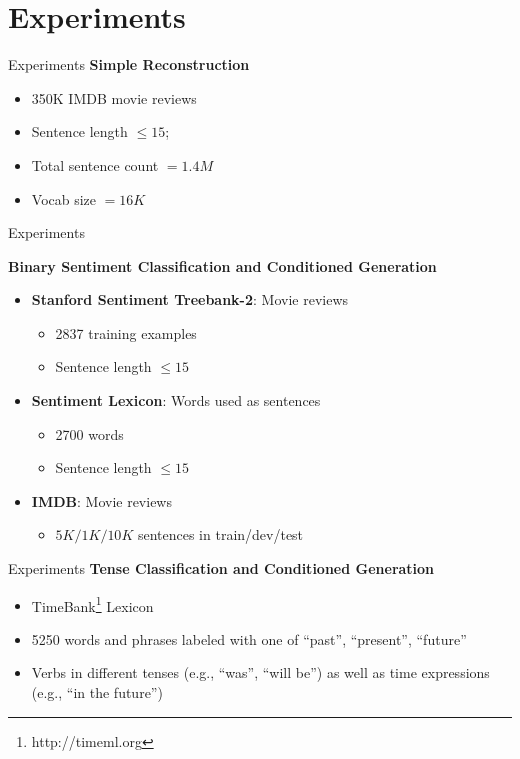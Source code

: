 \documentclass{beamer}
\begin{document}
\section{Experiments}
\begin{frame}{Experiments}
  \textbf{Simple Reconstruction}
  \begin{itemize}
    \item 350K IMDB movie reviews
    \item Sentence length $\leq 15$; 
    \item Total sentence count $= 1.4M$
    \item Vocab size $= 16K$
  \end{itemize}
\end{frame}

\begin{frame}{Experiments}

  \textbf{Binary Sentiment Classification and Conditioned Generation}

  \begin{itemize}
    \item \textbf{Stanford Sentiment Treebank-2}: Movie reviews
      \begin{itemize}
        \item 2837 training examples
        \item Sentence length $\leq 15$
      \end{itemize}
    \item \textbf{Sentiment Lexicon}: Words used as sentences
    \begin{itemize}
      \item 2700 words
      \item Sentence length $\leq 15$
    \end{itemize}
    \item \textbf{IMDB}: Movie reviews
    \begin{itemize}
      \item $5K/1K/10K$ sentences in train/dev/test
    \end{itemize}
  \end{itemize}
\end{frame}

\begin{frame}{Experiments}
  \textbf{Tense Classification and Conditioned Generation}
  \begin{itemize}
    \item TimeBank\footnote{http://timeml.org} Lexicon
    \item 5250 words and phrases labeled with one of {“past”, “present”, “future”}
    \item Verbs in different tenses (e.g., “was”, “will be”) as well as time expressions (e.g., “in the future”)
  \end{itemize}
\end{frame}
\end{document}
